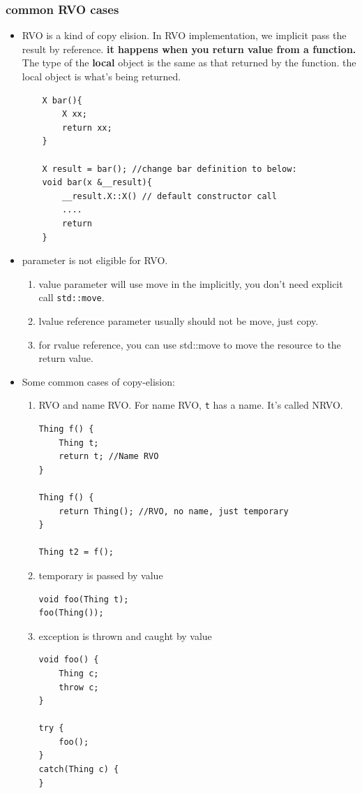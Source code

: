 \documentclass[a4paper,11pt,twoside]{book}
\begin{document}
\subsubsection{common RVO cases}
\begin{itemize}
	\item RVO is a kind of copy elision. In RVO implementation, we implicit pass the result by reference. \textbf{it happens when you return value from a function.} The type of the \textbf{local} object is the same as that returned by the function. the local object is what's being returned.
\begin{lstlisting}
	X bar(){
		X xx;
		return xx;
	}
	
	X result = bar(); //change bar definition to below:
	void bar(x &__result){
		__result.X::X() // default constructor call
		....
		return
	}
\end{lstlisting}

	\item parameter is not eligible for RVO. 
		\begin{enumerate}
			\item value parameter will use move in the implicitly, you don't need explicit call \texttt{std::move}.
			\item lvalue reference parameter usually should not be move, just copy.
			\item for rvalue reference, you can use std::move to move the resource to the return value.
		\end{enumerate}
	
	\item Some common cases of copy-elision:
	\begin{enumerate}
		\item RVO and name RVO. For name RVO, \texttt{t} has a name. It's called NRVO. 
\begin{lstlisting}[numbers=none]
Thing f() {
	Thing t;
	return t; //Name RVO
}

Thing f() {
	return Thing(); //RVO, no name, just temporary
}

Thing t2 = f();
\end{lstlisting}


	\item temporary is passed by value
\begin{lstlisting}[numbers=none]
void foo(Thing t);
foo(Thing());
\end{lstlisting}

	\item exception is thrown and caught by value
\begin{lstlisting}[numbers=none]
void foo() {
	Thing c;
	throw c;
}

try {
	foo();
}
catch(Thing c) {  
}
\end{lstlisting}

	\end{enumerate}

\end{itemize}
\end{document}
